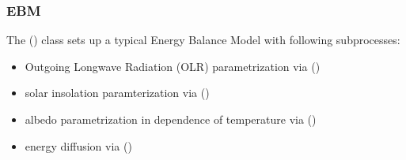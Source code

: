 \documentclass[a4paper,10pt,english]{sphinxmanual}
\begin{document}
\subsubsection{EBM}
\label{models:ebm}
The {\hyperref[api/climlab.model:climlab.model.ebm.EBM]{\emph{}}} () class sets up a typical Energy Balance Model with following subprocesses:
\begin{itemize}
\item {} 
Outgoing Longwave Radiation (OLR) parametrization via
{\hyperref[api/climlab.radiation:climlab.radiation.AplusBT.AplusBT]{\emph{}}} ()

\item {} 
solar insolation paramterization via
{\hyperref[api/climlab.radiation:climlab.radiation.insolation.P2Insolation]{\emph{}}} ()

\item {} 
albedo parametrization in dependence of temperature via
{\hyperref[api/climlab.surface:climlab.surface.albedo.StepFunctionAlbedo]{\emph{}}} ()

\item {} 
energy diffusion via
{\hyperref[api/climlab.dynamics:climlab.dynamics.diffusion.MeridionalDiffusion]{\emph{}}} ()

\end{itemize}
\end{document}
